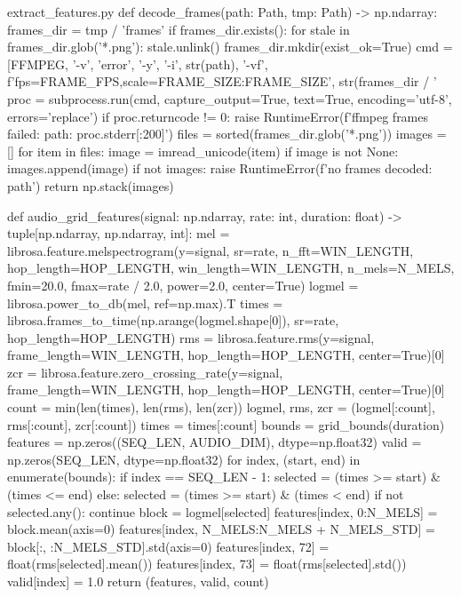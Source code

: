 \documentclass[bwprint]{gmcmthesis}
\begin{document}
\begin{appendices}
\begin{Python}{extract\_features.py}
def decode_frames(path: Path, tmp: Path) -> np.ndarray:
    frames_dir = tmp / 'frames'
    if frames_dir.exists():
        for stale in frames_dir.glob('*.png'):
            stale.unlink()
    frames_dir.mkdir(exist_ok=True)
    cmd = [FFMPEG, '-v', 'error', '-y', '-i', str(path), '-vf', f'fps={FRAME_FPS},scale={FRAME_SIZE}:{FRAME_SIZE}', str(frames_dir / '%
    proc = subprocess.run(cmd, capture_output=True, text=True, encoding='utf-8', errors='replace')
    if proc.returncode != 0:
        raise RuntimeError(f'ffmpeg frames failed: {path}: {proc.stderr[:200]}')
    files = sorted(frames_dir.glob('*.png'))
    images = []
    for item in files:
        image = imread_unicode(item)
        if image is not None:
            images.append(image)
    if not images:
        raise RuntimeError(f'no frames decoded: {path}')
    return np.stack(images)

def audio_grid_features(signal: np.ndarray, rate: int, duration: float) -> tuple[np.ndarray, np.ndarray, int]:
    mel = librosa.feature.melspectrogram(y=signal, sr=rate, n_fft=WIN_LENGTH, hop_length=HOP_LENGTH, win_length=WIN_LENGTH, n_mels=N_MELS, fmin=20.0, fmax=rate / 2.0, power=2.0, center=True)
    logmel = librosa.power_to_db(mel, ref=np.max).T
    times = librosa.frames_to_time(np.arange(logmel.shape[0]), sr=rate, hop_length=HOP_LENGTH)
    rms = librosa.feature.rms(y=signal, frame_length=WIN_LENGTH, hop_length=HOP_LENGTH, center=True)[0]
    zcr = librosa.feature.zero_crossing_rate(y=signal, frame_length=WIN_LENGTH, hop_length=HOP_LENGTH, center=True)[0]
    count = min(len(times), len(rms), len(zcr))
    logmel, rms, zcr = (logmel[:count], rms[:count], zcr[:count])
    times = times[:count]
    bounds = grid_bounds(duration)
    features = np.zeros((SEQ_LEN, AUDIO_DIM), dtype=np.float32)
    valid = np.zeros(SEQ_LEN, dtype=np.float32)
    for index, (start, end) in enumerate(bounds):
        if index == SEQ_LEN - 1:
            selected = (times >= start) & (times <= end)
        else:
            selected = (times >= start) & (times < end)
        if not selected.any():
            continue
        block = logmel[selected]
        features[index, 0:N_MELS] = block.mean(axis=0)
        features[index, N_MELS:N_MELS + N_MELS_STD] = block[:, :N_MELS_STD].std(axis=0)
        features[index, 72] = float(rms[selected].mean())
        features[index, 73] = float(rms[selected].std())
        valid[index] = 1.0
    return (features, valid, count)


\end{Python}
\end{appendices}
\end{document}
